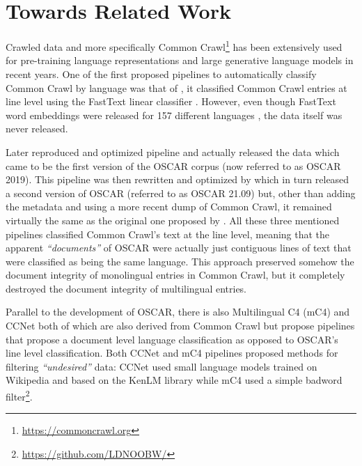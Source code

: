 \chapter{Towards Related Work}

Crawled data and more specifically Common Crawl\footnote{\url{https://commoncrawl.org}} has been extensively used for pre-training language representations and large generative language models in recent years. One of the first proposed pipelines to automatically classify Common Crawl by language was that of , it classified Common Crawl entries at line level using the FastText linear classifier \cite{joulin-etal-2016-fasttext,joulin-etal-2017-bag}. However, even though FastText word embeddings were released for 157 different languages \cite{grave-etal-2018-learning}, the data itself was never released.

Later  reproduced and optimized  pipeline and actually released the data which came to be the first version of the OSCAR corpus (now referred to as OSCAR 2019). This pipeline was then rewritten and optimized by  which in turn released a second version of OSCAR (referred to as OSCAR 21.09) but, other than adding the metadata and using a more recent dump of Common Crawl, it remained virtually the same as the original one proposed by . All these three mentioned pipelines \cite{grave-etal-2018-learning,ortiz-suarez-etal-2019-asynchronous,abadji-etal-2021-ungoliant} classified Common Crawl's text at the line level, meaning that the apparent \emph{``documents''} of OSCAR were actually just contiguous lines of text that were classified as being the same language. This approach preserved somehow the document integrity of monolingual entries in Common Crawl, but it completely destroyed the document integrity of multilingual entries.

Parallel to the development of OSCAR, there is also Multilingual C4 (mC4) \cite{xue-etal-2021-mt5} and CCNet \cite{wenzek-etal-2020-ccnet} both of which are also derived from Common Crawl but propose pipelines that propose a document level language classification as opposed to OSCAR's line level classification. Both CCNet and mC4 pipelines proposed methods for filtering \emph{``undesired''} data: CCNet used small language models trained on Wikipedia and based on the KenLM library \cite{heafield-2011-kenlm} while mC4 used a simple badword filter\footnote{\url{https://github.com/LDNOOBW/}}.

